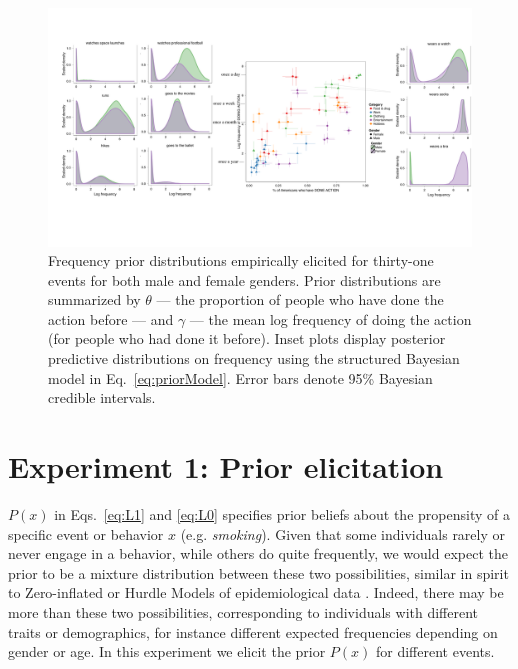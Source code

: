 \documentclass[10pt,letterpaper]{article}
\begin{document}
\begin{figure}[t]
\centering
  \includegraphics[width=\textwidth]{prior-scatter-insets}
  \caption{Frequency prior distributions empirically elicited for thirty-one events for both male and female genders. Prior distributions are summarized by $\theta$ --- the proportion of people who have done the action before --- and $\gamma$ --- the mean log frequency of doing the action (for people who had done it before).  Inset plots display posterior predictive distributions on frequency using the structured Bayesian model in Eq.~\ref{eq:priorModel}. Error bars denote 95\% Bayesian credible intervals.}
  \label{fig:priorScatter}
\end{figure}
%


\section{Experiment 1: Prior elicitation}

%
$P(x)$ in Eqs.~\ref{eq:L1} and \ref{eq:L0} specifies prior beliefs about the propensity of a specific event or behavior $x$  (e.g. \emph{smoking}).
Given that some individuals rarely or never engage in a behavior, while others do quite frequently, we would expect the prior to be a mixture distribution between these two possibilities, similar in spirit to Zero-inflated or Hurdle Models of epidemiological data \cite{hurdleModels}.
Indeed, there may be more than these two possibilities, corresponding to individuals with different traits or demographics, for instance different expected frequencies depending on gender or age. 
In this experiment we elicit the prior $P(x)$ for different events.
\end{document}
